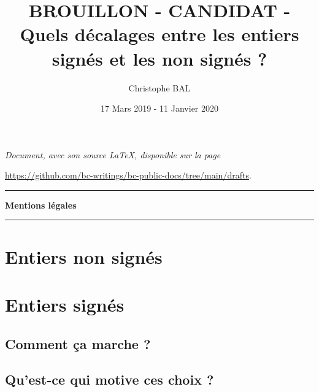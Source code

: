 \documentclass[12pt]{amsart}
\begin{document}
\title{BROUILLON - CANDIDAT - Quels décalages entre les entiers signés et les non signés ?}
\author{Christophe BAL}
\date{17 Mars 2019 - 11 Janvier 2020}

\maketitle

\begin{center}
	\itshape
	Document, avec son source \LaTeX, disponible sur la page

	\url{https://github.com/bc-writings/bc-public-docs/tree/main/drafts}.
\end{center}


\bigskip


\begin{center}
	\hrule\vspace{.3em}
	{
		\fontsize{1.35em}{1em}\selectfont
		\textbf{Mentions \og légales \fg}
	}

	\vspace{0.45em}
	\doclicenseThis
	\hrule
\end{center}


\bigskip
\setcounter{tocdepth}{2}
\tableofcontents





\section{Entiers non signés}






\section{Entiers signés}

\subsection{Comment ça marche ?}




\subsection{Qu'est-ce qui motive ces choix ?}


\end{document}
